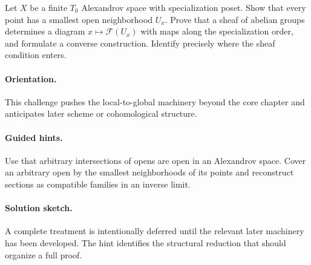 \begin{problem}
Let $X$ be a finite $T_0$ Alexandrov space with specialization poset. Show that every point has a smallest open neighborhood $U_x$. Prove that a sheaf of abelian groups determines a diagram $x\mapsto\mathcal F(U_x)$ with maps along the specialization order, and formulate a converse construction. Identify precisely where the sheaf condition enters.
\end{problem}

\ifdefined\FullProblemDossiers
\paragraph{Orientation.}
This challenge pushes the local-to-global machinery beyond the core chapter and anticipates later scheme or cohomological structure.

\paragraph{Guided hints.}
Use that arbitrary intersections of opens are open in an Alexandrov space. Cover an arbitrary open by the smallest neighborhoods of its points and reconstruct sections as compatible families in an inverse limit.

\paragraph{Solution sketch.}
A complete treatment is intentionally deferred until the relevant later machinery has been developed. The hint identifies the structural reduction that should organize a full proof.
\fi
